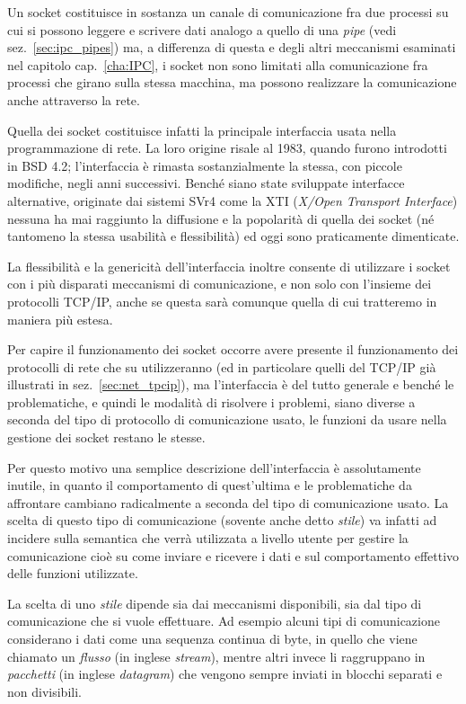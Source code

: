 Un socket costituisce in sostanza un canale di comunicazione fra due processi
su cui si possono leggere e scrivere dati analogo a quello di una
\textit{pipe} (vedi sez.~\ref{sec:ipc_pipes}) ma, a differenza di questa e
degli altri meccanismi esaminati nel capitolo cap.~\ref{cha:IPC}, i socket non
sono limitati alla comunicazione fra processi che girano sulla stessa
macchina, ma possono realizzare la comunicazione anche attraverso la rete.

Quella dei socket costituisce infatti la principale interfaccia usata nella
programmazione di rete.  La loro origine risale al 1983, quando furono
introdotti in BSD 4.2; l'interfaccia è rimasta sostanzialmente la stessa, con
piccole modifiche, negli anni successivi. Benché siano state sviluppate
interfacce alternative, originate dai sistemi SVr4 come la XTI (\textit{X/Open
  Transport Interface}) nessuna ha mai raggiunto la diffusione e la popolarità
di quella dei socket (né tantomeno la stessa usabilità e flessibilità) ed oggi
sono praticamente dimenticate.

La flessibilità e la genericità dell'interfaccia inoltre consente di
utilizzare i socket con i più disparati meccanismi di comunicazione, e non
solo con l'insieme dei protocolli TCP/IP, anche se questa sarà comunque quella
di cui tratteremo in maniera più estesa.

Per capire il funzionamento dei socket occorre avere presente il funzionamento
dei protocolli di rete che su utilizzeranno (ed in particolare quelli del
TCP/IP già illustrati in sez.~\ref{sec:net_tpcip}), ma l'interfaccia è del
tutto generale e benché le problematiche, e quindi le modalità di risolvere i
problemi, siano diverse a seconda del tipo di protocollo di comunicazione
usato, le funzioni da usare nella gestione dei socket restano le stesse.

Per questo motivo una semplice descrizione dell'interfaccia è assolutamente
inutile, in quanto il comportamento di quest'ultima e le problematiche da
affrontare cambiano radicalmente a seconda del tipo di comunicazione usato.
La scelta di questo tipo di comunicazione (sovente anche detto \textsl{stile})
va infatti ad incidere sulla semantica che verrà utilizzata a livello utente
per gestire la comunicazione cioè su come inviare e ricevere i dati e sul
comportamento effettivo delle funzioni utilizzate.

La scelta di uno \textsl{stile} dipende sia dai meccanismi disponibili, sia
dal tipo di comunicazione che si vuole effettuare. Ad esempio alcuni tipi di
comunicazione considerano i dati come una sequenza continua di byte, in quello
che viene chiamato un \textsl{flusso} (in inglese \textit{stream}), mentre
altri invece li raggruppano in \textsl{pacchetti} (in inglese
\textit{datagram}) che vengono sempre inviati in blocchi separati e non
divisibili.

